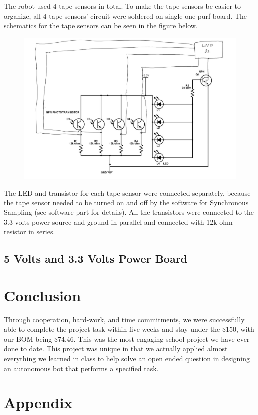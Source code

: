\documentclass{article}
\begin{document}
The robot used 4 tape sensors in total. To make the tape sensors be easier to organize, all 4 tape sensors' circuit were soldered on single one purf-board. The schematics for the tape sensors can be seen in the figure below.

\begin{figure}[H]
    \centering
    \includegraphics[scale = 0.3]{Tape_Sensor_Schematics.jpg}
\end{figure}

The LED and transistor for each tape sensor were connected separately, because the tape sensor needed to be turned on and off by the software for Synchronous Sampling (see software part for details). All the transistors were connected to the 3.3 volts power source and ground in parallel and connected with 12k ohm resistor in series. 


\subsection{5 Volts and 3.3 Volts Power Board}

\section{Conclusion}
\doublespacing
Through cooperation, hard-work, and time commitments, we were successfully able to complete the project task within five weeks and stay under the \$150, with our BOM being \$74.46.  This was the most engaging school project we have ever done to date.  This project was unique in that we actually applied almost everything we learned in class to help solve an open ended question in designing an autonomous bot that performs a specified task.  

\section{Appendix}
\end{document}

